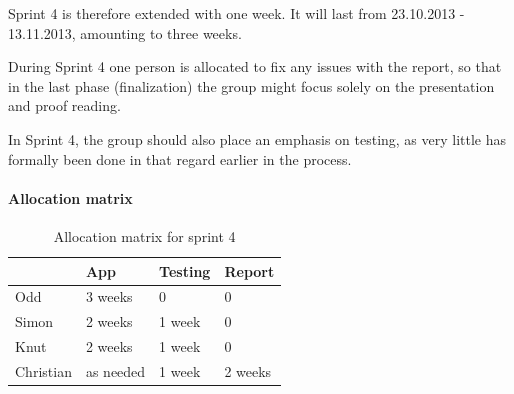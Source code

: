 \documentclass[11pt]{book}
\begin{document}
Sprint 4 is therefore extended with one week. It will last from 23.10.2013 - 13.11.2013, amounting to three weeks.

During Sprint 4 one person is allocated to fix any issues with the report, so that in the last phase (finalization) the group might focus solely on the presentation and proof reading.

In Sprint 4, the group should also place an emphasis on testing, as very little has formally been done in that regard earlier in the process.

\paragraph{Allocation matrix}
\begin{table}[H]
    \centering
    \begin{tabular}{| l | l | l | l |} \hline
         & App & Testing & Report\\
         \hline
         Odd & 3 weeks & 0 & 0\\
         \hline
         Simon & 2 weeks & 1 week & 0\\
         \hline
         Knut & 2 weeks & 1 week & 0\\
         \hline
         Christian & as needed & 1 week & 2 weeks\\
         \hline
    \end{tabular}
    \caption{Allocation matrix for sprint 4}
    \label{tab:phase_sprint4_allocation}
\end{table}
\end{document}
